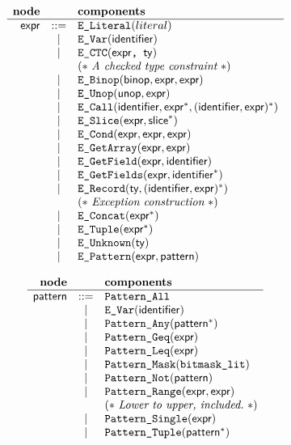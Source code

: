 \documentclass{book}
\begin{document}
\[
\begin{array}{rcll}
\textbf{node} & & \textbf{components} \\
\hline
\textsf{expr} &::=& \texttt{E\_Literal}(literal) \\
	&|& \texttt{E\_Var}(\texttt{\textsf{identifier}}) \\
	&|& \texttt{E\_CTC}(\texttt{\textsf{expr}, \textsf{ty}}) \\
    & & (*\ \textit{A checked type constraint}\ *)\\
	&|& \texttt{E\_Binop}(\textsf{binop}, \textsf{expr}, \textsf{expr}) \\
	&|& \texttt{E\_Unop}(\textsf{unop}, \textsf{expr}) \\
	&|& \texttt{E\_Call}(\textsf{identifier}, \textsf{expr}^{*}, (\textsf{identifier}, \textsf{expr})^{*}) \\
	&|& \texttt{E\_Slice}(\textsf{expr}, \textsf{slice}^{*}) \\
	&|& \texttt{E\_Cond}(\textsf{expr}, \textsf{expr}, \textsf{expr}) \\
	&|& \texttt{E\_GetArray}(\textsf{expr}, \textsf{expr}) \\
	&|& \texttt{E\_GetField}(\textsf{expr}, \textsf{identifier}) \\
	&|& \texttt{E\_GetFields}(\textsf{expr}, \textsf{identifier}^{*}) \\
	&|& \texttt{E\_Record}(\textsf{ty}, (\textsf{identifier}, \textsf{expr})^{*})\\
    & & (*\ \textit{Exception construction}\ *)\\
	&|& \texttt{E\_Concat}(\textsf{expr}^{*}) \\
	&|& \texttt{E\_Tuple}(\textsf{expr}^{*}) \\
	&|& \texttt{E\_Unknown}(\textsf{ty}) \\
	&|& \texttt{E\_Pattern}(\textsf{expr}, \textsf{pattern})
\end{array}
\]

\[
\begin{array}{rcll}
\textbf{node} & & \textbf{components} \\
\hline
\textsf{pattern} &::=& \texttt{Pattern\_All} \\
	&|& \texttt{E\_Var}(\texttt{\textsf{identifier}}) \\
  &|& \texttt{Pattern\_Any}(\textsf{pattern}^{*}) \\
  &|& \texttt{Pattern\_Geq}(\textsf{expr}) \\
  &|& \texttt{Pattern\_Leq}(\textsf{expr}) \\
  &|& \texttt{Pattern\_Mask}(\texttt{bitmask\_lit}) \\
  &|& \texttt{Pattern\_Not}(\textsf{pattern}) \\
  &|& \texttt{Pattern\_Range}(\textsf{expr}, \textsf{expr})\\
  & & (*\ \textit{Lower to upper, included.}\ *)\\
  &|& \texttt{Pattern\_Single}(\textsf{expr}) \\
  &|& \texttt{Pattern\_Tuple}(\textsf{pattern}^{*}) \\
\end{array}
\]
\end{document}

